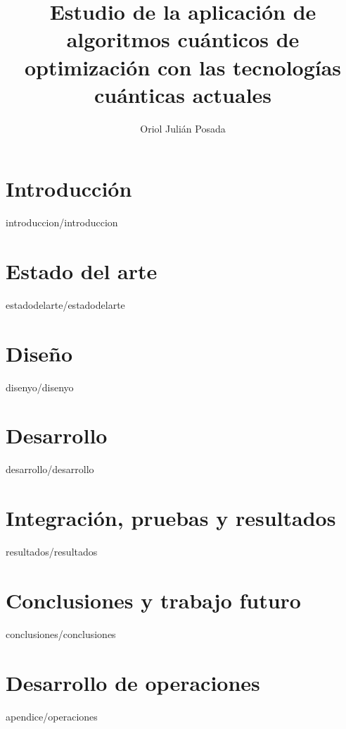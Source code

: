 \documentclass[epsbased,copyright,final,printable,covers,extendedindex,firstnumbered,tfg,gnuplot]{tfgtfmthesisuam}
\title[Aplicación de algoritmos cuánticos de optimización con las tecnologías cuánticas actuales]{Estudio de la aplicación de algoritmos cuánticos de optimización con las tecnologías cuánticas actuales}
\author{Oriol Julián Posada}
\begin{document}
\chapter{Introducción\label{cap:introduccion}}{introduccion/introduccion}

\chapter{Estado del arte\label{CAP:ESTADODELARTE}}{estadodelarte/estadodelarte}

\chapter{Diseño\label{CAP:DISEÑO}}{disenyo/disenyo}

\chapter{Desarrollo\label{CAP:DESARROLLO}}{desarrollo/desarrollo}

\chapter{Integración, pruebas y resultados\label{CAP:RESULTADOS}}{resultados/resultados}

\chapter{Conclusiones y trabajo futuro\label{CAP:CONCLUSIONES}}{conclusiones/conclusiones}



\newpage
{}




\appendix

\chapter{Desarrollo de operaciones}{apendice/operaciones}  %
\end{document}
